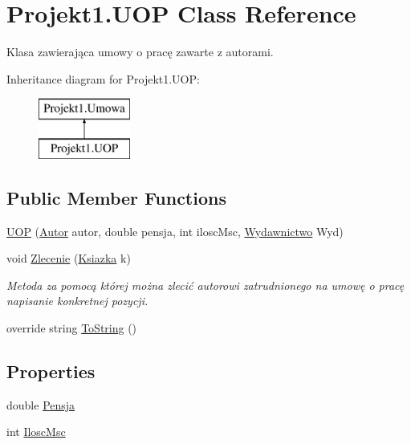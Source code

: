 \hypertarget{class_projekt1_1_1_u_o_p}{}\section{Projekt1.\+U\+OP Class Reference}
\label{class_projekt1_1_1_u_o_p}


Klasa zawierająca umowy o pracę zawarte z autorami.  


Inheritance diagram for Projekt1.\+U\+OP\+:\begin{figure}[H]
\begin{center}
\leavevmode
\includegraphics[height=2.000000cm]{class_projekt1_1_1_u_o_p}
\end{center}
\end{figure}
\subsection*{Public Member Functions}
\begin{DoxyCompactItemize}
\item 
\mbox{\hyperlink{class_projekt1_1_1_u_o_p_ac14809e97da3e9cede220d7a4081f7e6}{U\+OP}} (\mbox{\hyperlink{class_projekt1_1_1_autor}{Autor}} autor, double pensja, int ilosc\+Msc, \mbox{\hyperlink{class_projekt1_1_1_wydawnictwo}{Wydawnictwo}} Wyd)
\item 
void \mbox{\hyperlink{class_projekt1_1_1_u_o_p_aa2f46bfc4700f601a35eaa4d99b21727}{Zlecenie}} (\mbox{\hyperlink{class_projekt1_1_1_ksiazka}{Ksiazka}} k)
\begin{DoxyCompactList}\small\item\em Metoda za pomocą której można zlecić autorowi zatrudnionego na umowę o pracę napisanie konkretnej pozycji. \end{DoxyCompactList}\item 
override string \mbox{\hyperlink{class_projekt1_1_1_u_o_p_a50249c67a2308a1b43a14aadf795a9c8}{To\+String}} ()
\end{DoxyCompactItemize}
\subsection*{Properties}
\begin{DoxyCompactItemize}
\item 
double \mbox{\hyperlink{class_projekt1_1_1_u_o_p_aaa438ab39a784fd66ad75d898e3a0eea}{Pensja}}
\item 
int \mbox{\hyperlink{class_projekt1_1_1_u_o_p_a83eff9248d531ebf8100a0d8dfc3be68}{Ilosc\+Msc}}
\end{DoxyCompactItemize}
